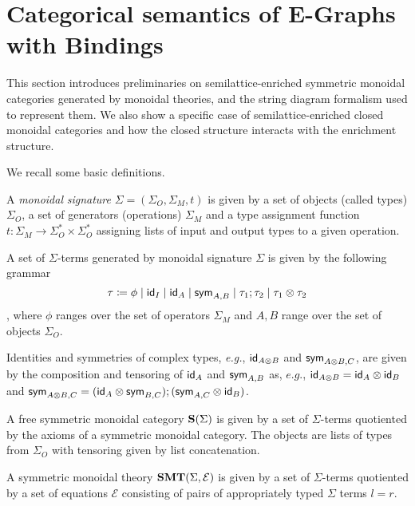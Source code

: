 \section{Categorical semantics of E-Graphs with Bindings}

This section introduces preliminaries on semilattice-enriched symmetric monoidal categories generated by monoidal theories, and the string diagram formalism used to represent them.
We also show a specific case of semilattice-enriched closed monoidal categories and how the closed structure interacts with the enrichment structure.

We recall some basic definitions.
\begin{definition}
A \textit{monoidal} \textit{signature} $\Sigma = (\Sigma_{O}, \Sigma_{M}, t)$ is given by a set of objects (called types) $\Sigma_{O}$, a set of generators (operations) $\Sigma_{M}$ and a type assignment function $t : \Sigma_{M} \to \Sigma_{O}^{*} \times \Sigma_{O}^{*}$ assigning lists of input and output types to a given operation.
\end{definition}

\begin{definition}
A set of $\Sigma$-terms generated by monoidal signature $\Sigma$ is given by the following grammar
\[
\tau \coloneqq \phi \;|\; \textsf{id}_{I} \;|\; \textsf{id}_{A} \;|\; \textsf{sym}_{A,B} \;|\; \tau_{1};\tau_{2} \;|\; \tau_{1} \otimes \tau_{2}
\],
where $\phi$ ranges over the set of operators $\Sigma_{M}$ and $A,B$ range over the set of objects $\Sigma_{O}$.
\end{definition}

Identities and symmetries of complex types, \textit{e.g.}, $\textsf{id}_{A \otimes B}$ and $\textsf{sym}_{A \otimes B, C}$, are given by the composition and tensoring of $\textsf{id}_{A}$ and $\textsf{sym}_{A,B}$ as, $\textit{e.g.}$, $\textsf{id}_{A \otimes B} = \textsf{id}_{A} \otimes \textsf{id}_{B}$ and $\textsf{sym}_{A \otimes B, C} = (\textsf{id}_{A} \otimes \textsf{sym}_{B,C});(\textsf{sym}_{A,C} \otimes \textsf{id}_{B})$.

\begin{definition}
A free symmetric monoidal category $\mathbf{S}(\Sigma)$ is given by a set of $\Sigma$-terms quotiented by the axioms of a symmetric monoidal category.
The objects are lists of types from $\Sigma_{O}$ with tensoring given by list concatenation.
\end{definition}

\begin{definition}
A symmetric monoidal theory $\mathbf{SMT}(\Sigma, \mathcal{E})$ is given by a set of $\Sigma$-terms quotiented by a set of equations $\mathcal{E}$ consisting of pairs of appropriately typed $\Sigma$ terms $l = r$.
\end{definition}

